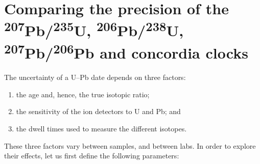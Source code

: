 \documentclass[gchron, manuscript]{copernicus}
\begin{document}











\appendix

\section{Comparing the precision of the
  \textsuperscript{207}Pb/\textsuperscript{235}U,
  \textsuperscript{206}Pb/\textsuperscript{238}U,
  \textsuperscript{207}Pb/\textsuperscript{206}Pb and concordia
  clocks}\label{app}

The uncertainty of a U--Pb date depends on three factors:

\begin{enumerate}
\item the age and, hence, the true isotopic ratio;
\item the sensitivity of the ion detectors to U and Pb; and
\item the dwell times used to measure the different isotopes.
\end{enumerate}

These three factors vary between samples, and between labs.  In order
to explore their effects, let us first define the following
parameters:
\end{document}
